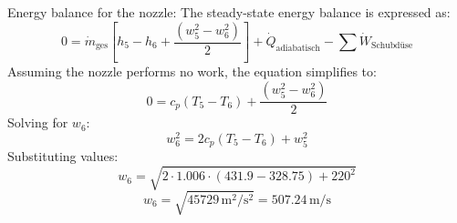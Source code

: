 Energy balance for the nozzle:  
The steady-state energy balance is expressed as:  
\[
0 = \dot{m}_{\text{ges}} \left[ h_5 - h_6 + \frac{(w_5^2 - w_6^2)}{2} \right] + \dot{Q}_{\text{adiabatisch}} - \sum \dot{W}_{\text{Schubdüse}}
\]  
Assuming the nozzle performs no work, the equation simplifies to:  
\[
0 = c_p (T_5 - T_6) + \frac{(w_5^2 - w_6^2)}{2}
\]  
Solving for \( w_6 \):  
\[
w_6^2 = 2 c_p (T_5 - T_6) + w_5^2
\]  
Substituting values:  
\[
w_6 = \sqrt{2 \cdot 1.006 \cdot (431.9 - 328.75) + 220^2}
\]  
\[
w_6 = \sqrt{45729 \, \text{m}^2/\text{s}^2} = 507.24 \, \text{m/s}
\]